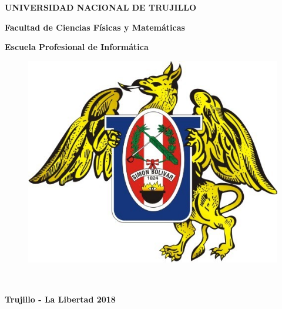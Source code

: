 \textheight 19cm
\pagestyle{empty}
\begin{center}
 {\bf {\fontsize{14}{16.8}\selectfont UNIVERSIDAD NACIONAL DE TRUJILLO}}     
 
    {\bf{\fontsize{14}{16.8}\selectfont Facultad de Ciencias Físicas y Matemáticas}} 

  {\bf{\fontsize{14}{16.8}\selectfont Escuela Profesional de Informática}}
\end{center}  

\begin{figure}[ht]
\begin{center}
\includegraphics[width=.4\textwidth]{unt}
\end{center}
\end{figure}

\vskip 2cm
\begin{center}
  { \bf {\fontsize{17}{20.4}\selectfont{DISEÑO DE UN AGENTE INTELIGENTE  }}     
  \vskip 3cm
  {\bf \fontsize{14}{16.8}\selectfont {Carlos Eduardo Plasencia Prado}}} \\
    {\bf \fontsize{14}{16.8}\selectfont {Piere Andre Ruiz Alba}} 

\end{center}   
\vskip 1.3cm
\begin{center}    
{\bf {\fontsize{14}{16.8}\selectfont Trujillo - La Libertad
\vskip 0.0cm
\hspace*{-0.2cm} 
2018 }}
\end{center} 
\newpage


\newpage
\pagestyle{plain}

\hspace*{6cm}
\vskip 9cm
\begin{center}
   {\bf \doublespacing {\fontsize{17}{20.4}\selectfont{MODELO PARA LA RUTERIZACIÓN }}}     
\end{center} 
\newpage


